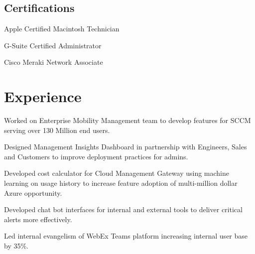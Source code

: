 \documentclass[]{deedy-resume-openfont}
\begin{document}
\begin{minipage}[t]{0.33\textwidth}
\subsection{Certifications}
\vspace{\topsep}
\begin{tightemize}
\item Apple Certified Macintosh Technician
\item G-Suite Certified Administrator
\item Cisco Meraki Network Associate
\end{tightemize}


%
%

\end{minipage} 
\hfill
\begin{minipage}[t]{0.66\textwidth} 


\section{Experience}

\vspace{\topsep} %
\begin{tightemize}
\item Worked on Enterprise Mobility Management team to develop features for SCCM serving over 130 Million end users.
\item Designed Management Insights Dashboard in partnership with Engineers, Sales and Customers to improve deployment practices for admins.
\item Developed cost calculator for Cloud Management Gateway using machine learning on usage history to increase feature adoption of multi-million dollar Azure opportunity.
\end{tightemize}
\sectionsep

\vspace{\topsep} %
\begin{tightemize}
\item Developed chat bot interfaces for internal and external tools to deliver critical alerts more effectively.
\item Led internal evangelism of WebEx Teams platform increasing internal user base by 35\%.
\end{tightemize}
\sectionsep


\end{minipage}
\end{document}
